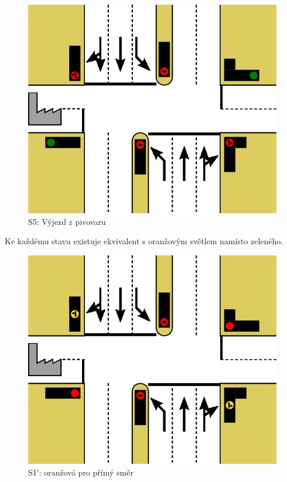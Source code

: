 \documentclass[12pt, a4paper]{report}
\begin{document}
\begin{figure}[!h]
	\centering
		\includegraphics{image/S5_krizovatka.jpg}
	\caption{S5: Výjezd z pivovaru}
	\label{fig:S5_krizovatka}
\end{figure}

\clearpage

\noindent
Ke každému stavu existuje ekvivalent s oranžovým světlem namísto zeleného.\\

\begin{figure}[!h]
	\centering
		\includegraphics{image/S1+_krizovatka.jpg}
	\caption{S1': oranžová pro přímý směr}
	\label{fig:S1+_krizovatka}
\end{figure}
\end{document}
